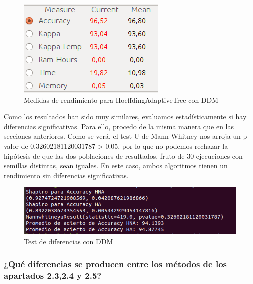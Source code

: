 \begin{figure}[H] %
	\centering
	\includegraphics[scale=0.5]{measures52.png}  %
	\caption{Medidas de rendimiento para HoeffdingAdaptiveTree con DDM} 
	\label{fig:measure52}
\end{figure}

Como los resultados han sido muy similares, evaluamos estadísticamente si hay diferencias significativas. Para ello, procedo de la misma manera que en las secciones anteriores. Como se verá, el test U de Mann-Whitney nos arroja un p-valor de 
0.32602181120031787 > 0.05, por lo que no podemos rechazar la hipótesis de que las dos poblaciones de resultados, fruto de 30 ejecuciones con semillas distintas, sean iguales. En este caso, ambos algoritmos tienen un rendimiento sin diferencias significativas.

\begin{figure}[H] %
	\centering
	\includegraphics[scale=0.5]{test5.png}  %
	\caption{Test de diferencias con DDM} 
	\label{fig:test5}
\end{figure}

\subsubsection{¿Qué diferencias se producen entre los métodos de los apartados 2.3,2.4 y 2.5?}

